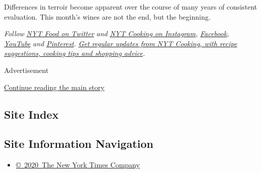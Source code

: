 Differences in terroir become apparent over the course of many years of
consistent evaluation. This month's wines are not the end, but the
beginning.

\emph{Follow} \emph{\href{https://twitter.com/nytfood}{NYT Food on
Twitter}} \emph{and}
\emph{\href{https://www.instagram.com/nytcooking/}{NYT Cooking on
Instagram},}
\emph{\href{https://www.facebookcorewwwi.onion/nytcooking/}{Facebook},}
\emph{\href{https://www.youtube.com/nytcooking}{YouTube}} \emph{and}
\emph{\href{https://www.pinterest.com/nytcooking/}{Pinterest}.}
\emph{\href{https://www.nytimes3xbfgragh.onion/newsletters/cooking}{Get
regular updates from NYT Cooking, with recipe suggestions, cooking tips
and shopping advice}.}

Advertisement

\protect\hyperlink{after-bottom}{Continue reading the main story}

\hypertarget{site-index}{%
\subsection{Site Index}\label{site-index}}

\hypertarget{site-information-navigation}{%
\subsection{Site Information
Navigation}\label{site-information-navigation}}

\begin{itemize}
\tightlist
\item
  \href{https://help.nytimes3xbfgragh.onion/hc/en-us/articles/115014792127-Copyright-notice}{©~2020~The
  New York Times Company}
\end{itemize}

